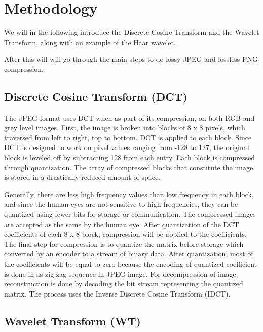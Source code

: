 \section{Methodology}

We will in the following introduce the Discrete Cosine Transform and the Wavelet Transform, along with an example of the Haar wavelet. 

After this will will go through the main steps to do lossy JPEG and lossless PNG compression.


\subsection{Discrete Cosine Transform (DCT)}

The JPEG format uses DCT \cite{dct} when as part of its compression, on both RGB and grey level images. 
First, the image is broken into blocks of 8 x 8 pixels, which traversed from left to right, top to bottom. DCT is applied to each block. 
Since DCT is designed to work on pixel values ranging from -128 to 127, the original block
is leveled off by subtracting 128 from each entry. 
Each block is compressed through quantization. The array of compressed blocks that constitute the image is stored in a drastically reduced amount of space. 

Generally, there are less high frequency values than low frequency in each block, and since the human eyes are not sensitive to high frequencies, they can be quantized using fewer bits for storage or communication.
The compressed images are accepted as the same by the human eye. 
After quantization of the DCT coefficients of each 8 x 8 block, compression will be applied to the coefficients.
The final step for compression is to quantize the matrix before storage which converted by an encoder to a stream of binary data. 
After quantization, most of the coefficients will be equal to zero because the encoding  of quantized coefficient is done in as zig-zag sequence in JPEG image. 
For decompression of image, reconstruction is done by decoding the bit stream representing the quantized matrix. The process uses the Inverse Discrete Cosine Transform (IDCT).

\subsection{Wavelet Transform (WT)}

